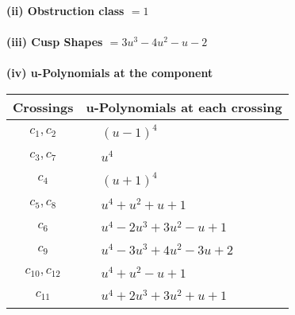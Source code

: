 \documentclass[1p]{elsarticle_modified}
\theoremstyle{definition}
\begin{document}
\flushleft \textbf{(ii) Obstruction class $= 1$}\\~\\
\flushleft \textbf{(iii) Cusp Shapes $= 3 u^3-4 u^2- u-2$}\\~\\
\newpage\renewcommand{\arraystretch}{1}
\flushleft \textbf{(iv) u-Polynomials at the component}\newline \\
\begin{tabular}{m{50pt}|m{274pt}}
Crossings & \hspace{64pt}u-Polynomials at each crossing \\
\hline $$\begin{aligned}c_{1},c_{2}\end{aligned}$$&$\begin{aligned}
&(u-1)^4
\end{aligned}$\\
\hline $$\begin{aligned}c_{3},c_{7}\end{aligned}$$&$\begin{aligned}
&u^4
\end{aligned}$\\
\hline $$\begin{aligned}c_{4}\end{aligned}$$&$\begin{aligned}
&(u+1)^4
\end{aligned}$\\
\hline $$\begin{aligned}c_{5},c_{8}\end{aligned}$$&$\begin{aligned}
&u^4+u^2+u+1
\end{aligned}$\\
\hline $$\begin{aligned}c_{6}\end{aligned}$$&$\begin{aligned}
&u^4-2 u^3+3 u^2- u+1
\end{aligned}$\\
\hline $$\begin{aligned}c_{9}\end{aligned}$$&$\begin{aligned}
&u^4-3 u^3+4 u^2-3 u+2
\end{aligned}$\\
\hline $$\begin{aligned}c_{10},c_{12}\end{aligned}$$&$\begin{aligned}
&u^4+u^2- u+1
\end{aligned}$\\
\hline $$\begin{aligned}c_{11}\end{aligned}$$&$\begin{aligned}
&u^4+2 u^3+3 u^2+u+1
\end{aligned}$\\
\hline
\end{tabular}\\~\\
\end{document}
